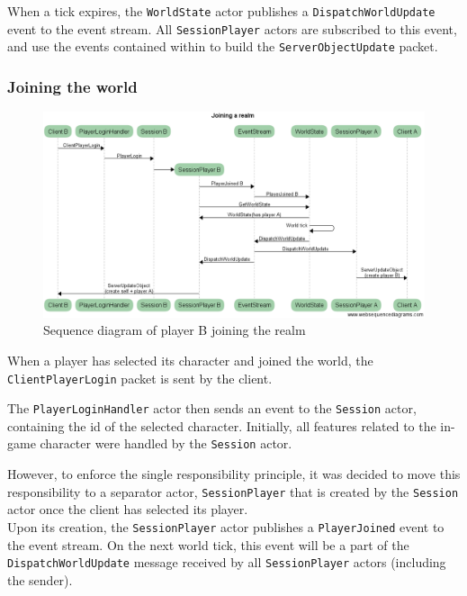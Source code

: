 \documentclass[paper=a4, fontsize=11pt]{scrartcl}
\begin{document}
When a tick expires, the \texttt{WorldState} actor publishes a
\texttt{DispatchWorldUpdate} event to the event stream.
All \texttt{SessionPlayer} actors are subscribed to this event, and use the
events contained within to build the \texttt{ServerObjectUpdate} packet.

\subsubsection{Joining the world}\label{jtw}

\begin{figure}[htb!]
    \hspace*{-2.5cm}
    \centering
    \includegraphics[width=0.95\paperwidth]{playerLogin}
    \caption{Sequence diagram of player B joining the realm}
\end{figure}

When a player has selected its character and joined the world, the
\texttt{ClientPlayerLogin} packet is sent by the client.

The \texttt{PlayerLoginHandler} actor then sends an event to the \texttt{Session}
actor, containing the id of the selected character.
Initially, all features related to the in-game character were handled by the
\texttt{Session} actor.

However, to enforce the single responsibility principle, it was decided to move
this responsibility to a separator actor, \texttt{SessionPlayer} that is created
by the \texttt{Session} actor once the client has selected its player.\\

Upon its creation, the \texttt{SessionPlayer} actor publishes a
\texttt{PlayerJoined} event to the event stream.  
On the next world tick, this event will be a part of the
\texttt{DispatchWorldUpdate} message received by all \texttt{SessionPlayer}
actors (including the sender).
\end{document}
